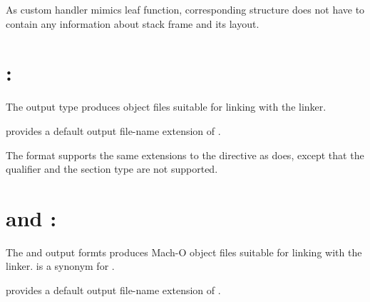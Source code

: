 As custom handler mimics leaf function, corresponding 
structure does not have to contain any information about stack frame
and its layout.

\section{: }
\label{sec:cofffmt}

The  output type produces  object files suitable for
linking with the  linker.

 provides a default output file-name extension of .

The  format supports the same extensions to the 
directive as  does, except that the  qualifier and
the  section type are not supported.

\section{ and :
}
\label{sec:machofmt}

The  and  output formts produces Mach-O
object files suitable for linking with the  linker.
 is a synonym for .

 provides a default output file-name extension of .

